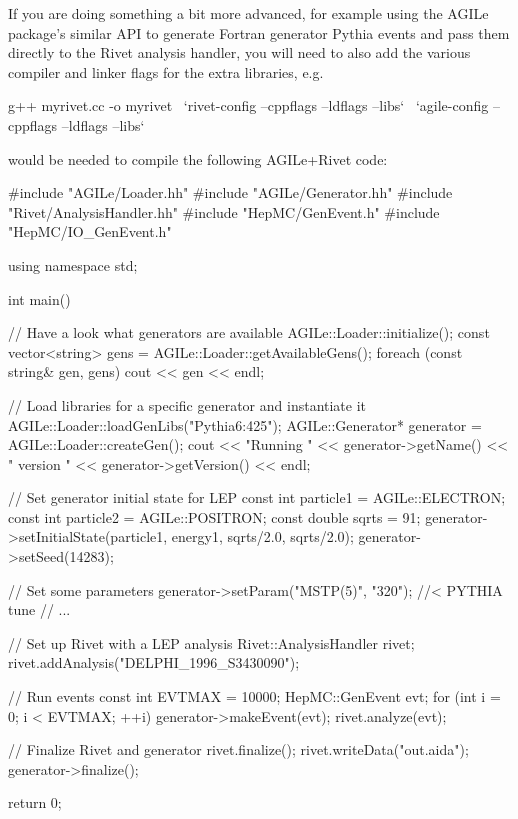 If you are doing something a bit more advanced, for example using the AGILe
package's similar API to generate Fortran generator Pythia events and pass them
directly to the Rivet analysis handler, you will need to also add the various
compiler and linker flags for the extra libraries, e.g.
%
\begin{snippet}
g++ myrivet.cc -o myrivet \
  `rivet-config --cppflags --ldflags --libs` \
  `agile-config --cppflags --ldflags --libs`
\end{snippet}
%
would be needed to compile the following AGILe+Rivet code:
%
\goodbreak
\begin{snippet}
#include "AGILe/Loader.hh"
#include "AGILe/Generator.hh"
#include "Rivet/AnalysisHandler.hh"
#include "HepMC/GenEvent.h"
#include "HepMC/IO_GenEvent.h"

using namespace std;

int main() {
  // Have a look what generators are available
  AGILe::Loader::initialize();
  const vector<string> gens = AGILe::Loader::getAvailableGens();
  foreach (const string& gen, gens) {
    cout << gen << endl;
  }

  // Load libraries for a specific generator and instantiate it
  AGILe::Loader::loadGenLibs("Pythia6:425");
  AGILe::Generator* generator = AGILe::Loader::createGen();
  cout << "Running " << generator->getName()
       << " version " << generator->getVersion() << endl;

  // Set generator initial state for LEP
  const int particle1 = AGILe::ELECTRON;
  const int particle2 = AGILe::POSITRON;
  const double sqrts = 91;
  generator->setInitialState(particle1, energy1, sqrts/2.0, sqrts/2.0);
  generator->setSeed(14283);

  // Set some parameters
  generator->setParam("MSTP(5)", "320"); //< PYTHIA tune
  // ...

  // Set up Rivet with a LEP analysis
  Rivet::AnalysisHandler rivet;
  rivet.addAnalysis("DELPHI_1996_S3430090");

  // Run events
  const int EVTMAX = 10000;
  HepMC::GenEvent evt;
  for (int i = 0; i < EVTMAX; ++i) {
    generator->makeEvent(evt);
    rivet.analyze(evt);
  }

  // Finalize Rivet and generator
  rivet.finalize();
  rivet.writeData("out.aida");
  generator->finalize();

  return 0;
}
\end{snippet}


